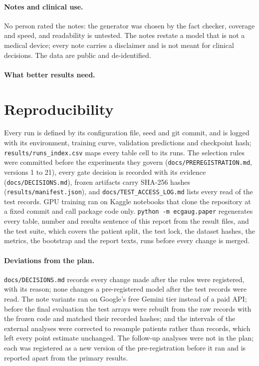 \documentclass[11pt]{article}
\begin{document}
\paragraph{Notes and clinical use.} No person rated the notes: the generator was chosen by the fact checker, coverage and speed, and
readability is untested. The notes restate a model that is not a medical device; every note carries a disclaimer and is not meant for
clinical decisions. The data are public and de-identified.

\paragraph{What better results need.} 

\section{Reproducibility}\label{sec:reproducibility}
Every run is defined by its configuration file, seed and git commit, and is logged with its environment, training curve, validation
predictions and checkpoint hash; \texttt{results/runs\_index.csv} maps every table cell to its runs. The selection rules were committed
before the experiments they govern (\texttt{docs/PREREGISTRATION.md}, versions 1 to 21), every gate decision is recorded with its evidence
(\texttt{docs/DECISIONS.md}), frozen artifacts carry SHA-256 hashes (\texttt{results/manifest.json}), and
\texttt{docs/TEST\_ACCESS\_LOG.md} lists every read of the test records. GPU training ran on Kaggle notebooks that clone the repository at
a fixed commit and call package code only. \texttt{python -m ecgaug.paper} regenerates every table, number and results sentence of this
report from the result files, and the test suite, which covers the patient split, the test lock, the dataset hashes, the metrics, the
bootstrap and the report texts, runs before every change is merged.

\paragraph{Deviations from the plan.} \texttt{docs/DECISIONS.md} records every change made after the rules were registered, with its
reason; none changes a pre-registered model after the test records were read. The note variants ran on Google's free Gemini tier instead
of a paid API; before the final evaluation the test arrays were rebuilt from the raw records with the frozen code and matched their
recorded hashes; and the intervals of the external analyses were corrected to resample patients rather than records, which left every
point estimate unchanged. The follow-up analyses were not in the plan; each was registered as a new version of the pre-registration
before it ran and is reported apart from the primary results.

\begingroup\footnotesize
\let\oldthebibliography\thebibliography
\renewcommand\thebibliography[1]{\oldthebibliography{#1}\setlength{\itemsep}{1pt}\setlength{\parskip}{0pt}}


\endgroup
\end{document}
